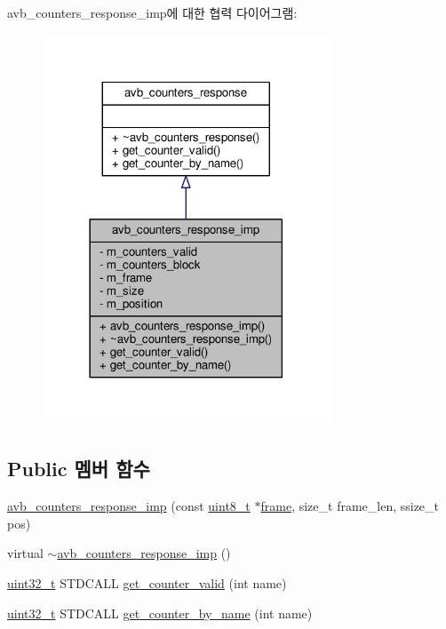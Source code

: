 avb\+\_\+counters\+\_\+response\+\_\+imp에 대한 협력 다이어그램\+:
\nopagebreak
\begin{figure}[H]
\begin{center}
\leavevmode
\includegraphics[width=242pt]{classavdecc__lib_1_1avb__counters__response__imp__coll__graph}
\end{center}
\end{figure}
\subsection*{Public 멤버 함수}
\begin{DoxyCompactItemize}
\item 
\hyperlink{classavdecc__lib_1_1avb__counters__response__imp_a4a55378b63bf94e482734bff259e1a57}{avb\+\_\+counters\+\_\+response\+\_\+imp} (const \hyperlink{stdint_8h_aba7bc1797add20fe3efdf37ced1182c5}{uint8\+\_\+t} $\ast$\hyperlink{gst__avb__playbin_8c_ac8e710e0b5e994c0545d75d69868c6f0}{frame}, size\+\_\+t frame\+\_\+len, ssize\+\_\+t pos)
\item 
virtual \hyperlink{classavdecc__lib_1_1avb__counters__response__imp_a9de6da288d2623a6c180ed8f75b51e62}{$\sim$avb\+\_\+counters\+\_\+response\+\_\+imp} ()
\item 
\hyperlink{parse_8c_a6eb1e68cc391dd753bc8ce896dbb8315}{uint32\+\_\+t} S\+T\+D\+C\+A\+LL \hyperlink{classavdecc__lib_1_1avb__counters__response__imp_a192c298bbf4dbeef7d3d88d892732455}{get\+\_\+counter\+\_\+valid} (int name)
\item 
\hyperlink{parse_8c_a6eb1e68cc391dd753bc8ce896dbb8315}{uint32\+\_\+t} S\+T\+D\+C\+A\+LL \hyperlink{classavdecc__lib_1_1avb__counters__response__imp_a5746c406e06afbbd5f35819f8e378476}{get\+\_\+counter\+\_\+by\+\_\+name} (int name)
\end{DoxyCompactItemize}
